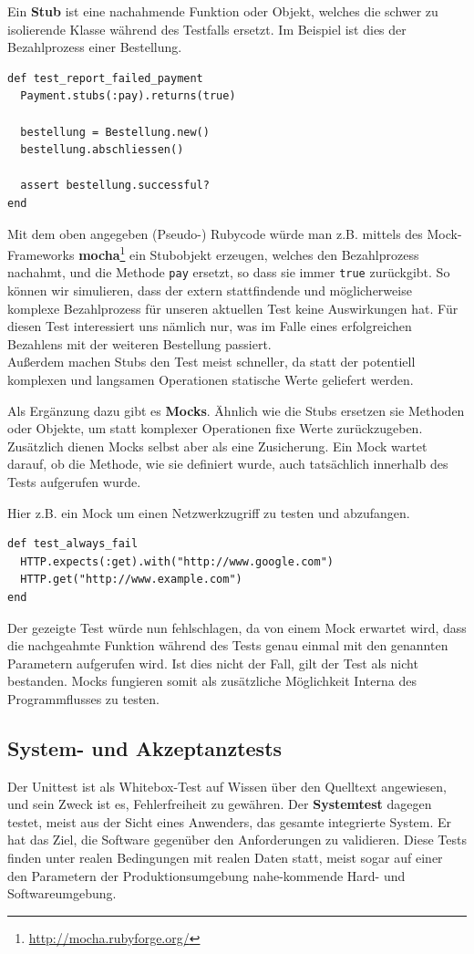   Ein \textbf{Stub} ist eine nachahmende Funktion oder Objekt, welches die schwer zu isolierende Klasse während des Testfalls ersetzt. Im Beispiel ist dies der Bezahlprozess einer Bestellung. %
  \begin{lstlisting}
def test_report_failed_payment
  Payment.stubs(:pay).returns(true)

  bestellung = Bestellung.new()
  bestellung.abschliessen()

  assert bestellung.successful?
end
  \end{lstlisting}
  Mit dem oben angegeben (Pseudo-) Rubycode würde man z.B. mittels des Mock-Frameworks \textbf{mocha}\footnote{\url{http://mocha.rubyforge.org/}} ein Stubobjekt erzeugen, welches den Bezahlprozess nachahmt, und die Methode \texttt{pay} ersetzt, so dass sie immer \texttt{true} zurückgibt. So können wir simulieren, dass der extern stattfindende und möglicherweise komplexe Bezahlprozess für unseren aktuellen Test keine Auswirkungen hat. Für diesen Test interessiert uns nämlich nur, was im Falle eines erfolgreichen Bezahlens mit der weiteren Bestellung passiert.\\
  Außerdem machen Stubs den Test meist schneller, da statt der potentiell komplexen und langsamen Operationen statische Werte geliefert werden.

  Als Ergänzung dazu gibt es \textbf{Mocks}. Ähnlich wie die Stubs ersetzen sie Methoden oder Objekte, um statt komplexer Operationen fixe Werte zurückzugeben. Zusätzlich dienen Mocks selbst aber als eine Zusicherung. Ein Mock wartet darauf, ob die Methode, wie sie definiert wurde, auch tatsächlich innerhalb des Tests aufgerufen wurde.

  Hier z.B. ein Mock um einen Netzwerkzugriff zu testen und abzufangen. %
  \begin{lstlisting}
def test_always_fail
  HTTP.expects(:get).with("http://www.google.com")
  HTTP.get("http://www.example.com")
end
  \end{lstlisting}
  Der gezeigte Test würde nun fehlschlagen, da von einem Mock erwartet wird, dass die nachgeahmte Funktion während des Tests genau einmal mit den genannten Parametern aufgerufen wird. Ist dies nicht der Fall, gilt der Test als nicht bestanden. Mocks fungieren somit als zusätzliche Möglichkeit Interna des Programmflusses zu testen.

\subsection{System- und Akzeptanztests}
\label{sec:acceptance}
Der Unittest ist als Whitebox-Test auf Wissen über den Quelltext angewiesen, und sein Zweck ist es, Fehlerfreiheit zu gewähren. Der \textbf{Systemtest} dagegen testet, meist aus der Sicht eines Anwenders, das gesamte integrierte System. Er hat das Ziel, die Software gegenüber den Anforderungen zu validieren. Diese Tests finden unter realen Bedingungen mit realen Daten statt, meist sogar auf einer den Parametern der Produktionsumgebung nahe-kommende Hard- und Softwareumgebung.

